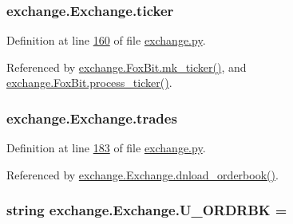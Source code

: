 \subsubsection[{\texorpdfstring{ticker}{ticker}}]{\setlength{\rightskip}{0pt plus 5cm}exchange.\+Exchange.\+ticker}\hypertarget{classexchange_1_1_exchange_a7cf9e52f993627955a2e242c388daaeb}{}\label{classexchange_1_1_exchange_a7cf9e52f993627955a2e242c388daaeb}


Definition at line \hyperlink{exchange_8py_source_l00160}{160} of file \hyperlink{exchange_8py_source}{exchange.\+py}.



Referenced by \hyperlink{exchange_8py_source_l00474}{exchange.\+Fox\+Bit.\+mk\+\_\+ticker()}, and \hyperlink{exchange_8py_source_l00453}{exchange.\+Fox\+Bit.\+process\+\_\+ticker()}.

\subsubsection[{\texorpdfstring{trades}{trades}}]{\setlength{\rightskip}{0pt plus 5cm}exchange.\+Exchange.\+trades}\hypertarget{classexchange_1_1_exchange_a30e87a377320ce05bd956fb014683641}{}\label{classexchange_1_1_exchange_a30e87a377320ce05bd956fb014683641}


Definition at line \hyperlink{exchange_8py_source_l00183}{183} of file \hyperlink{exchange_8py_source}{exchange.\+py}.



Referenced by \hyperlink{exchange_8py_source_l00194}{exchange.\+Exchange.\+dnload\+\_\+orderbook()}.

\subsubsection[{\texorpdfstring{U\+\_\+\+O\+R\+D\+R\+BK}{U_ORDRBK}}]{\setlength{\rightskip}{0pt plus 5cm}string exchange.\+Exchange.\+U\+\_\+\+O\+R\+D\+R\+BK = \textquotesingle{}\textquotesingle{}\hspace{0.3cm}{\ttfamily [static]}}\hypertarget{classexchange_1_1_exchange_a83174d2fe96a1c737231d3b8b18d9807}{}\label{classexchange_1_1_exchange_a83174d2fe96a1c737231d3b8b18d9807}


